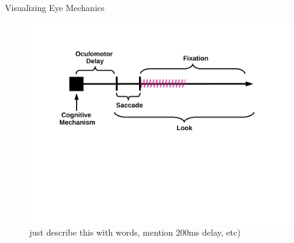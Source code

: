 \documentclass{beamer}
\providecommand{\cn}[1]{\textcolor{blue}{#1}}
\begin{document}
\begin{frame}{Visualizing Eye Mechanics}
\vspace{-1mm}
\begin{figure}
\centering
\includegraphics[scale=0.45]{img/what_is_a_look.pdf}
\caption{just describe this with words, mention 200ms delay, etc)}
\end{figure}
\end{frame}


%
%
%
%
%
\end{document}

